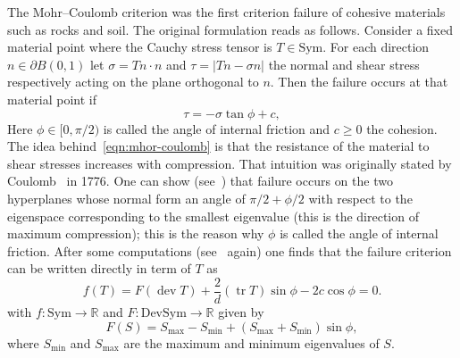 \documentclass[a4paper,10pt,oneside]{amsbook}
\numberwithin{section}{chapter}
\numberwithin{equation}{chapter}
\theoremstyle{definition}
\DeclareMathOperator{\dev}{dev}
\DeclareMathOperator{\tr}{tr}
\begin{document}
The Mohr--Coulomb criterion was the first criterion failure of cohesive materials such as rocks and soil. The original formulation reads as follows. Consider a fixed material point where the Cauchy stress tensor is $T\in\text{Sym}$. For each direction $n\in\partial B(0,1)$ let $\sigma=Tn\cdot n$ and $\tau=|Tn-\sigma n|$ the normal and shear stress respectively acting on the plane orthogonal to $n$. Then the failure occurs at that material point if
\begin{equation}
\label{eqn:mhor-coulomb}
\tau=-\sigma\tan\phi+c,
\end{equation}
Here $\phi\in[0,\pi/2)$ is called the angle of internal friction and $c\ge0$ the cohesion. The idea behind~\eqref{eqn:mhor-coulomb} is that the resistance of the material to shear stresses increases with compression. That intuition was originally stated by Coulomb~\cite{Coulomb1776} in 1776. One can show (see~\cite{Lubliner1990}) that failure occurs on the two hyperplanes whose normal form an angle of $\pi/2+\phi/2$ with respect to the eigenspace corresponding to the smallest eigenvalue (this is the direction of maximum compression); this is the reason why $\phi$ is called the angle of internal friction.
After some computations (see~\cite{Lubliner1990} again) one finds that the failure criterion can be written directly in term of $T$ as
\begin{equation}
\label{eqn:f-mohr-coulomb}
f(T)=F(\dev T)+\frac{2}{d}(\tr T)\sin\phi-2c\cos\phi=0.
\end{equation}
with $f\colon\text{Sym}\to\mathbb{R}$ and $F\colon\text{DevSym}\to\mathbb{R}$ given by
\begin{equation}
\label{eqn:F-mohr-coulomb}
F(S)=S_\text{max}-S_\text{min}+(S_\text{max}+S_\text{min})\sin\phi,
\end{equation}
where $S_\text{min}$ and $S_\text{max}$ are the maximum and minimum eigenvalues of $S$.
\end{document}
